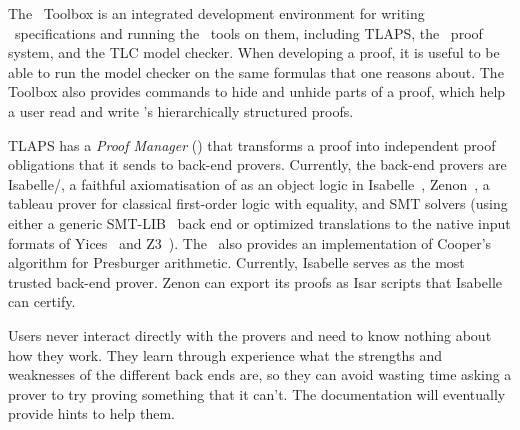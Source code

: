 \documentclass[a4paper]{llncs}
\begin{document}

The \tlaplus\ Toolbox is an integrated development environment for
writing \tlaplus\ specifications and running the \tlaplus\ tools on
them, including TLAPS, the \tlaplus\ proof system, and the TLC model
checker. When developing a proof, it is useful to be able to run the model checker on
the same formulas that one reasons about.  The Toolbox also provides
commands to hide and unhide parts of a proof, which help a user read
and write \tlaplus's hierarchically structured proofs.



TLAPS has a \textit{Proof Manager} (\PM) that transforms a proof into
independent proof obligations that it sends to back-end provers.
Currently, the back-end provers are Isabelle/\tlaplus, a faithful
axiomatisation of \tlaplus as an object logic in Isabelle~\cite{wenzel:isabelle},
Zenon~\cite{bonichon07lpar}, a tableau prover for classical
first-order logic with equality, and SMT solvers (using either a generic
SMT-LIB~\cite{smtlib} back end or optimized translations to the native input
formats of Yices~\cite{yices} and Z3~\cite{z3}).
The \PM\ also provides an implementation of Cooper's
algorithm for Presburger arithmetic.  Currently, Isabelle serves as
the most trusted back-end prover.  Zenon can export its proofs as Isar
scripts that Isabelle can certify.

Users never interact directly with the provers and need to know
nothing about how they work.  They learn through experience what the
strengths and weaknesses of the different back ends are, so they can
avoid wasting time asking a prover to try proving something that it
can't.  The documentation will eventually provide hints to help
them.
\end{document}
